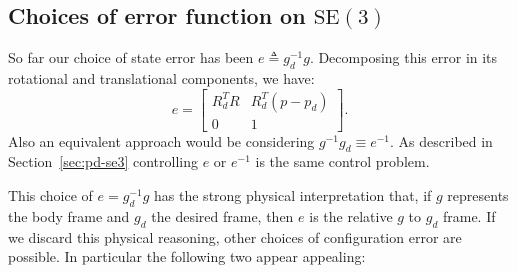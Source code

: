 \documentclass[10pt,twocolumn]{article}
\newcommand{\SE}{\mathrm{SE}}
\begin{document}
\subsection{Choices of error function on $\SE(3)$}\label{subsec:error-functions-se3}
So far our choice of state error has been $e\triangleq g_d^{-1}g$. Decomposing this error in its rotational and translational components, we have:
\begin{equation*}
e=\begin{bmatrix}
R_d^TR&R_d^T(p-p_d)\\
0&1
\end{bmatrix}.\tag{13}\label{eq:13}
\end{equation*}
Also an equivalent approach would be considering $g^{-1}g_d\equiv e^{-1}$. As described in Section~\ref{sec:pd-se3} controlling $e$ or $e^{-1}$ is the same control problem.

This choice of $e=g_d^{-1}g$ has the strong physical interpretation that, if $g$ represents the body frame and $g_d$ the desired frame, then $e$ is the relative $g$ to $g_d$ frame. If we discard this physical reasoning, other choices of configuration error are possible. In particular the following two appear appealing:
\end{document}
